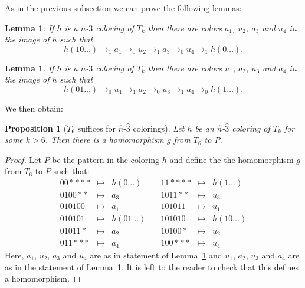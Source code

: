 \documentclass[a4paper]{article}
\newcommand{\any}{{*}}
\newtheorem{lemma}[theorem]{Lemma}
\newtheorem{proposition}[theorem]{Proposition}
\begin{document}
As in the previous subsection we can prove the following lemmas:
\begin{lemma} \label{three zero}
 If $h$ is a $n$-$3$ coloring of $T_k$ then there are colors $a_1$,
$u_2$, $a_3$ and $u_4$ in the image of $h$ such that
\[
 h(10\dots) \rightarrow_1 a_1 \rightarrow_0 u_2 \rightarrow_1 a_3
\rightarrow_0 u_4 \rightarrow_1 h(0\dots).
\]
\end{lemma}

\begin{lemma} \label{three one}
 If $h$ is a $n$-$3$ coloring of $T_k$ then there are colors $u_1$,
$a_2$, $u_3$ and $a_4$ in the image of $h$ such that
\[
 h(01\dots) \rightarrow_0 u_1 \rightarrow_1 a_2 \rightarrow_0 u_3
\rightarrow_1 a_4 \rightarrow_0 h(1\dots).
\]
\end{lemma}

We then obtain:
\begin{proposition}[$T_6$ suffices for $\hat{n}$-$\hat{3}$ colorings]
 Let $h$ be an $\hat{n}$-$\hat{3}$ coloring of $T_k$ for some $k > 6$. Then
there is a homomorphism $g$ from $T_6$ to $P$.
\end{proposition}
\begin{proof}
Let $P$ be the pattern in the coloring $h$ and define the the
homomorphism $g$ from $T_6$ to $P$ such that:
\[
 \begin{array}{rcl}
 00\any\any\any\any & \mapsto & h(0\dots) \\
 0100\any\any & \mapsto & a_3 \\
 010100 & \mapsto & a_1 \\
 010101 & \mapsto & h(01\dots) \\
 01011\any & \mapsto & a_2 \\
 011\any\any\any & \mapsto & a_4
 \end{array} \quad
 \begin{array}{rcl}
 11\any\any\any\any & \mapsto & h(1\dots) \\
 1011\any\any & \mapsto & u_3 \\
 101011 & \mapsto & u_1 \\
 101010 & \mapsto & h(10\dots) \\
 10100\any & \mapsto & u_2 \\
 100\any\any\any & \mapsto & u_4
 \end{array}
\]
Here, $a_1$, $u_2$, $a_3$ and $u_4$ are as in statement of
Lemma~\ref{three zero} and $u_1$, $a_2$, $u_3$ and $a_4$ are as in the
statement of Lemma~\ref{three one}. It is left to the reader to check
that this defines a homomorphism.
\end{proof}
\end{document}
